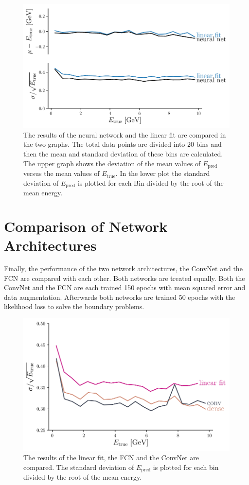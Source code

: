 \documentclass[12pt, a4paper]{thesis}
\begin{document}
\begin{figure}[hbtp]
  \centering
  \includegraphics[width=.9\linewidth]{../images/likelihood_res.pdf}
  \caption{ The results of the neural network and the linear fit are
    compared in the two graphs. The total data points are divided into
    20 bins and then the mean and standard deviation of these bins are
    calculated. The upper graph shows the deviation of the mean values
    of \(E_{\text{pred}}\) versus the mean values of
    \(E_{\text{true}}\). In the lower plot the standard deviation of
    \(E_{\text{pred}}\) is plotted for each Bin divided by the root of
    the mean energy.}
  \label{likelihood_res}
\end{figure}

\clearpage
\section{Comparison of Network Architectures}
\label{sec:org1df3a0b}

Finally, the performance of the two network architectures, the ConvNet
and the FCN are compared with each other. Both networks are treated
equally. Both the ConvNet and the FCN are each trained 150 epochs with
mean squared error and data augmentation. Afterwards both networks are
trained 50 epochs with the likelihood loss to solve the boundary
problems.

\begin{figure}[hbtp]
  \centering
  \includegraphics[width=.9\linewidth]{../images/arch_comparison.pdf}
  \caption{ The results of the linear fit, the FCN and the ConvNet are
    compared. The standard deviation of \(E_{\text{pred}}\) is plotted
    for each bin divided by the root of the mean energy.}
  \label{arch_comparison}
\end{figure}
\end{document}
